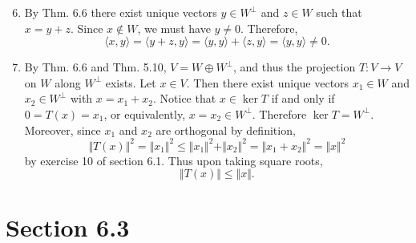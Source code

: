 \documentclass[12pt]{article}
\begin{document}
\begin{enumerate}
\setcounter{enumi}{5}
\item
By Thm. 6.6 there exist unique vectors $y \in W^\bot$ and $z \in W$ such that $x = y + z$. Since $x \not \in W$, we must have $y \neq 0$. Therefore,
\begin{equation*}
\langle x, y \rangle = \langle y + z, y \rangle = \langle y, y \rangle + \langle z, y \rangle = \langle y, y \rangle \neq 0.
\end{equation*}

\setcounter{enumi}{9}
\item
By Thm. 6.6 and Thm. 5.10, $V = W \oplus W^\bot$, and thus the projection $T : V \to V$ on $W$ along $W^\bot$ exists. Let $x \in V$. Then there exist unique vectors $x_1 \in W$ and $x_2 \in W^\bot$ with $x = x_1 + x_2$. Notice that $x \in \ker T$ if and only if $0 = T(x) = x_1$, or equivalently, $x = x_2 \in W^\bot$. Therefore $\ker T = W^\bot$. Moreover, since $x_1$ and $x_2$ are orthogonal by definition,
\begin{equation*}
\Vert T(x) \Vert^2 = \Vert x_1 \Vert^2 \leq \Vert x_1 \Vert^2 + \Vert x_2 \Vert^2 = \Vert x_1 + x_2 \Vert^2 = \Vert x \Vert^2
\end{equation*}
by exercise 10 of section 6.1. Thus upon taking square roots,
\begin{equation*}
\Vert T(x) \Vert \leq \Vert x \Vert.
\end{equation*}

\end{enumerate}

\section*{Section 6.3}
\end{document}
